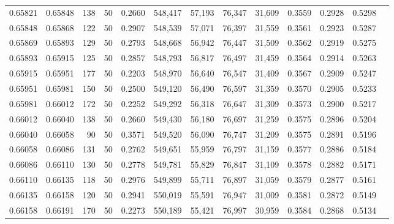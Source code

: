 \begin{tabular}{rrrrrrrrrrrrr}
0.65821 & 0.65848 &   138 &  50 &                                     0.2660 & 548,417 &  57,193 &  76,347 &  31,609 & 0.3559 & 0.2928 & 0.5298 \\
0.65848 & 0.65868 &   122 &  50 &                                     0.2907 & 548,539 &  57,071 &  76,397 &  31,559 & 0.3561 & 0.2923 & 0.5287 \\
0.65869 & 0.65893 &   129 &  50 &                                     0.2793 & 548,668 &  56,942 &  76,447 &  31,509 & 0.3562 & 0.2919 & 0.5275 \\
0.65893 & 0.65915 &   125 &  50 &                                     0.2857 & 548,793 &  56,817 &  76,497 &  31,459 & 0.3564 & 0.2914 & 0.5263 \\
0.65915 & 0.65951 &   177 &  50 &                                     0.2203 & 548,970 &  56,640 &  76,547 &  31,409 & 0.3567 & 0.2909 & 0.5247 \\
0.65951 & 0.65981 &   150 &  50 &                                     0.2500 & 549,120 &  56,490 &  76,597 &  31,359 & 0.3570 & 0.2905 & 0.5233 \\
0.65981 & 0.66012 &   172 &  50 &                                     0.2252 & 549,292 &  56,318 &  76,647 &  31,309 & 0.3573 & 0.2900 & 0.5217 \\
0.66012 & 0.66040 &   138 &  50 &                                     0.2660 & 549,430 &  56,180 &  76,697 &  31,259 & 0.3575 & 0.2896 & 0.5204 \\
0.66040 & 0.66058 &    90 &  50 &                                     0.3571 & 549,520 &  56,090 &  76,747 &  31,209 & 0.3575 & 0.2891 & 0.5196 \\
0.66058 & 0.66086 &   131 &  50 &                                     0.2762 & 549,651 &  55,959 &  76,797 &  31,159 & 0.3577 & 0.2886 & 0.5184 \\
0.66086 & 0.66110 &   130 &  50 &                                     0.2778 & 549,781 &  55,829 &  76,847 &  31,109 & 0.3578 & 0.2882 & 0.5171 \\
0.66110 & 0.66135 &   118 &  50 &                                     0.2976 & 549,899 &  55,711 &  76,897 &  31,059 & 0.3579 & 0.2877 & 0.5161 \\
0.66135 & 0.66158 &   120 &  50 &                                     0.2941 & 550,019 &  55,591 &  76,947 &  31,009 & 0.3581 & 0.2872 & 0.5149 \\
0.66158 & 0.66191 &   170 &  50 &                                     0.2273 & 550,189 &  55,421 &  76,997 &  30,959 & 0.3584 & 0.2868 & 0.5134 \\

\end{tabular}
